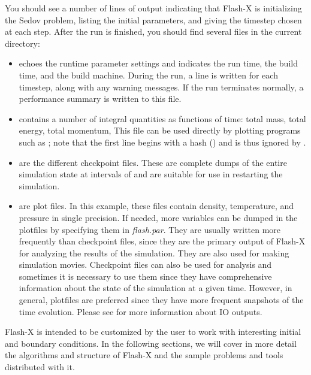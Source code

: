 You should see a number of lines of output indicating that Flash-X is 
initializing the Sedov problem, listing the initial parameters, and 
giving the timestep chosen at each step. After the run is finished, 
you should find several files in the current directory:
\begin{itemize} 
\item {}%
  echoes the
    runtime parameter settings and indicates the run time, the build
    time, and the build machine. During the run, a line is written
    for each timestep, along with any warning messages. If the run
    terminates normally, a performance summary is written to this
    file. 
\begin {comment}
Messages indicating when the code refined and what output
    resulted are also contained in \code{sedov.log}.  
\end{comment}
\item {}%
  contains a
      number of integral quantities as functions of time: total
      mass, total energy, total momentum, \etc  This file can
      be used directly by plotting programs such as ;
      note that the first line begins with a hash (\code{\#}) and is
      thus ignored by .  

\item {} are the different checkpoint
       files. These are complete dumps of the entire simulation state at
        intervals of  
	and are suitable for use in
        restarting the simulation. \item
{} are plot files. In this example, these 
        files contain density, temperature, and pressure in single
precision.  If needed, more variables can be dumped in the plotfiles
by specifying them in \emph{flash.par}. They are usually
written more frequently 
than checkpoint files, since they are 
the primary output of Flash-X for analyzing the results of the
simulation. They are also used for making simulation
movies. Checkpoint files can also be used for analysis and sometimes
it is necessary to use them since they have comprehensive information
about the state of the simulation at a given time. However, in general,
plotfiles are preferred since they have more frequent snapshots of the
time evolution. Please see  for more information about IO outputs.
\end{itemize}


Flash-X is intended to be customized by the user to work with
interesting initial and boundary conditions.  In the following
sections, we will cover in more detail the algorithms and structure of
Flash-X and the sample problems and tools distributed with it.
